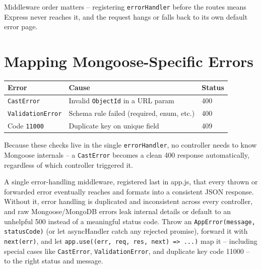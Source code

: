 \begin{warnbox}[WARNING]
Middleware order matters -- registering \texttt{errorHandler} before the routes means Express never reaches it, and the request hangs or falls back to its own default error page.
\end{warnbox}

\section{Mapping Mongoose-Specific Errors}

\begin{center}
\begin{tabularx}{\textwidth}{lXl}
\toprule
\textbf{Error} & \textbf{Cause} & \textbf{Status} \\
\midrule
\texttt{CastError} & Invalid \texttt{ObjectId} in a URL param & 400 \\
\texttt{ValidationError} & Schema rule failed (required, enum, etc.) & 400 \\
Code \texttt{11000} & Duplicate key on unique field & 409 \\
\bottomrule
\end{tabularx}
\end{center}

\begin{tipbox}[TIP]
Because these checks live in the single \texttt{errorHandler}, no controller needs to know Mongoose internals -- a \texttt{CastError} becomes a clean 400 response automatically, regardless of which controller triggered it.
\end{tipbox}

\whatwhyhow
{A single error-handling middleware, registered last in app.js, that every thrown or forwarded error eventually reaches and formats into a consistent JSON response.}
{Without it, error handling is duplicated and inconsistent across every controller, and raw Mongoose/MongoDB errors leak internal details or default to an unhelpful 500 instead of a meaningful status code.}
{Throw an \texttt{AppError(message, statusCode)} (or let asyncHandler catch any rejected promise), forward it with \texttt{next(err)}, and let \texttt{app.use((err, req, res, next) => ...)} map it -- including special cases like \texttt{CastError}, \texttt{ValidationError}, and duplicate key code 11000 -- to the right status and message.}
